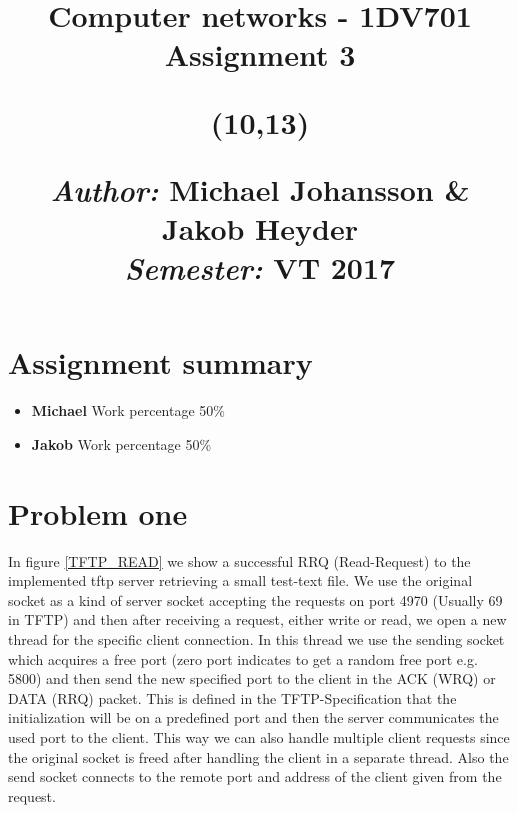 \documentclass[a4paper,12pt]{article}
\title{	
\vspace{-8cm}
\begin{sidebar}
    \vspace{10cm}
    \normalfont \normalsize
    \vspace{-1.3cm}
\end{sidebar}
\vspace{3cm}
\begin{flushleft}
    \huge Computer networks - 1DV701 \\ 
    \LARGE  Assignment 3\\
\end{flushleft}
\null
\vfill
\begin{textblock}{6}(10,13)
\begin{flushright}
\begin{minipage}{\textwidth}
\begin{flushleft} \large
\emph{Author:} Michael Johansson \& Jakob Heyder\\ %
\emph{Semester:} VT 2017\\ %
\end{flushleft}
\end{minipage}
\end{flushright}
\end{textblock}
}
\date{}
\numberwithin{figure}{section}
\begin{document}
\maketitle
\clearpage


\newpage
{}
\tableofcontents %
\newpage
{}

%
%

\section{Assignment summary}

\begin{itemize}
\item\textbf{Michael}
Work percentage 50\%

\item\textbf{Jakob} 
Work percentage 50\%
\end{itemize}



\newpage

\section{Problem one}

In figure \ref{TFTP_READ} we show a successful RRQ (Read-Request) to the implemented tftp server retrieving a small test-text file.
\newline \noindent
We use the original socket as a kind of server socket accepting the requests on port 4970 (Usually 69 in TFTP) and then after receiving a request, either write or read, we open a new thread for the specific client connection. In this thread we use the sending socket which acquires a free port (zero port indicates to get a random free port e.g. 5800) and then send the new specified port to the client in the ACK (WRQ) or DATA (RRQ) packet.  This is defined in the TFTP-Specification that the initialization will be on a predefined port and then the server communicates the used port to the client. This way we can also handle multiple client requests since the original socket is freed after handling the client in a separate thread. Also the send socket connects to the remote port and address of the client given from the request.
\end{document}
